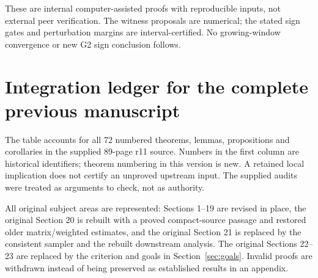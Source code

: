 \documentclass[11pt]{article}
\theoremstyle{remark}
\begin{document}
These are internal computer-assisted proofs with reproducible inputs,
not external peer verification. The witness proposals are numerical;
the stated sign gates and perturbation margins are interval-certified.
No growing-window convergence or new G2 sign conclusion follows.


\section{Integration ledger for the complete previous manuscript}\label{app:ledger}
The table accounts for all 72 numbered theorems, lemmas, propositions and
corollaries in the supplied 89-page r11 source. Numbers in the first column
are historical identifiers; theorem numbering in this version is new.
A retained local implication does not certify an unproved upstream input.
The supplied audits were treated as arguments to check, not as authority.

All original subject areas are represented: Sections 1--19 are revised in
place, the original Section 20 is rebuilt with a proved compact-source passage
and restored older matrix/weighted estimates, and the original Section 21
is replaced by the consistent sampler and the rebuilt downstream analysis.
The original Sections 22--23 are replaced by the criterion and goals in
Section~\ref{sec:goals}. Invalid proofs are withdrawn instead of being
preserved as established results in an appendix.
\end{document}
